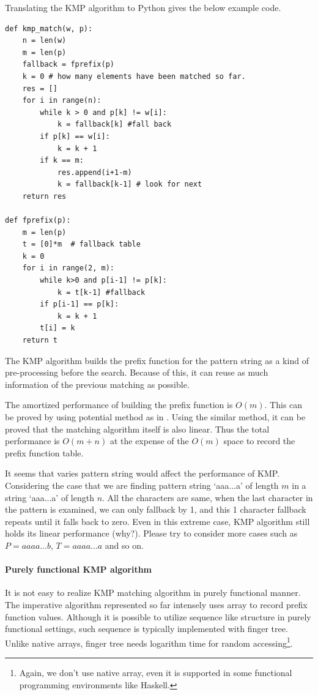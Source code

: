 \documentclass[UTF8]{article}
\begin{document}
Translating the KMP algorithm to Python gives the below example code.

\lstset{language=Python}
\begin{lstlisting}
def kmp_match(w, p):
    n = len(w)
    m = len(p)
    fallback = fprefix(p)
    k = 0 # how many elements have been matched so far.
    res = []
    for i in range(n):
        while k > 0 and p[k] != w[i]:
            k = fallback[k] #fall back
        if p[k] == w[i]:
            k = k + 1
        if k == m:
            res.append(i+1-m)
            k = fallback[k-1] # look for next
    return res

def fprefix(p):
    m = len(p)
    t = [0]*m  # fallback table
    k = 0
    for i in range(2, m):
        while k>0 and p[i-1] != p[k]:
            k = t[k-1] #fallback
        if p[i-1] == p[k]:
            k = k + 1
        t[i] = k
    return t
\end{lstlisting}

The KMP algorithm builds the prefix function for the pattern string as a kind of pre-processing before the
search. Because of this, it can reuse as much information of the previous matching as possible.

The amortized performance of building the prefix function is $O(m)$. This can be proved by using potential
method as in \cite{CLRS}. Using the similar method, it can be proved that the matching algorithm itself is
also linear. Thus the total performance is $O(m + n)$ at the expense of the $O(m)$ space to record the
prefix function table.

It seems that varies pattern string would affect the performance of KMP. Considering the case that
we are finding pattern string `aaa...a' of length $m$ in a string `aaa...a' of length $n$.
All the characters are same, when the last character in the pattern is examined, we can only fallback by 1,
and this 1 character fallback repeats until it falls back to zero. Even in this extreme case, KMP
algorithm still holds its linear performance (why?). Please try to consider more cases such as $P = aaaa...b$,
$T = aaaa...a$ and so on.

\paragraph{Purely functional KMP algorithm}

It is not easy to realize KMP matching algorithm in purely functional manner. The imperative algorithm represented
so far intensely uses array to record prefix function values. Although it is possible to utilize sequence like structure
in purely functional settings, such sequence is typically implemented with finger tree. Unlike native arrays,
finger tree needs logarithm time for random accessing\footnote{Again, we don't use native array, even it is supported in some functional programming environments like Haskell.}.
\end{document}
